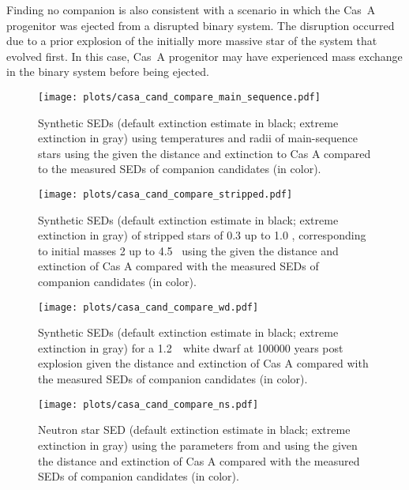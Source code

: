 \documentclass{aa}
\begin{document}
Finding no companion is also consistent with a scenario in which the Cas~A progenitor was ejected from a disrupted binary system. The disruption occurred due to a prior explosion of the initially more massive star of the system that evolved first. In this case, Cas~A progenitor may have experienced mass exchange in the binary system before being ejected.

\begin{figure*}[h!]

  \begin{subfigure}[t]{.47\textwidth}
   \centering
   \texttt{[image: plots/casa\_cand\_compare\_main\_sequence.pdf]}
  \caption{Synthetic SEDs (default extinction estimate in black; extreme extinction in gray) using temperatures and radii of main-sequence stars using the given the distance and extinction to Cas A compared to the measured SEDs of companion candidates (in color).}
  \label{fig:sed_model_ms_compare}
  \end{subfigure}
  \medskip
  \begin{subfigure}[t]{.47\textwidth}
   \centering
   \texttt{[image: plots/casa\_cand\_compare\_stripped.pdf]}
   \caption{Synthetic SEDs (default extinction estimate in black; extreme extinction in gray) of stripped stars of 0.3 up to 1.0 \msun, corresponding to initial masses 2 up to 4.5 \msun\ using the given the distance and extinction of Cas A compared with the measured SEDs of companion candidates (in color).}
  \label{fig:sed_model_stripped_compare}
  \end{subfigure}
  \medskip
  \begin{subfigure}[t]{.47\textwidth}
   \centering
   \texttt{[image: plots/casa\_cand\_compare\_wd.pdf]}
  \caption{Synthetic SEDs (default extinction estimate in black; extreme extinction in gray) for a 1.2~\msun\ white dwarf at \num{100000} years post explosion given the distance and extinction of Cas A compared with the measured SEDs of companion candidates (in color).}
  \label{fig:sed_model_wd_compare}
  \end{subfigure}\hfill
  \begin{subfigure}[t]{.47\textwidth}
   \centering
   \texttt{[image: plots/casa\_cand\_compare\_ns.pdf]}
  \caption{Neutron star SED (default extinction estimate in black; extreme extinction in gray) using the parameters from \citet{2009Natur.462...71H} and using the given the distance and extinction of Cas A compared with the measured SEDs of companion candidates (in color).}
  \label{fig:sed_model_ns_compare}
  \end{subfigure}
  

\end{figure*}
\end{document}
